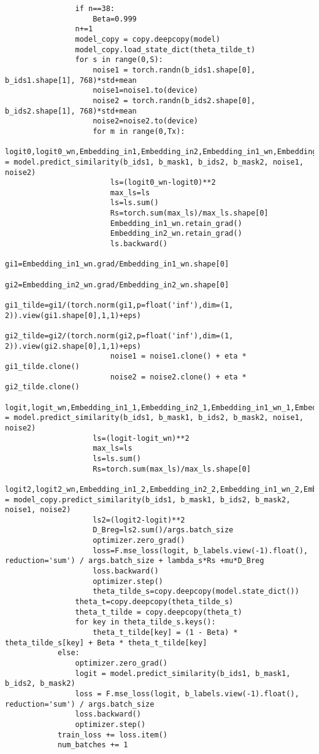 \begin{lstlisting}
                if n==38:
                    Beta=0.999
                n+=1
                model_copy = copy.deepcopy(model)
                model_copy.load_state_dict(theta_tilde_t)
                for s in range(0,S):
                    noise1 = torch.randn(b_ids1.shape[0], b_ids1.shape[1], 768)*std+mean
                    noise1=noise1.to(device)
                    noise2 = torch.randn(b_ids2.shape[0], b_ids2.shape[1], 768)*std+mean
                    noise2=noise2.to(device)
                    for m in range(0,Tx):
                        logit0,logit0_wn,Embedding_in1,Embedding_in2,Embedding_in1_wn,Embedding_in2_wn = model.predict_similarity(b_ids1, b_mask1, b_ids2, b_mask2, noise1, noise2)
                        ls=(logit0_wn-logit0)**2
                        max_ls=ls
                        ls=ls.sum()
                        Rs=torch.sum(max_ls)/max_ls.shape[0]
                        Embedding_in1_wn.retain_grad()
                        Embedding_in2_wn.retain_grad()
                        ls.backward()
                        gi1=Embedding_in1_wn.grad/Embedding_in1_wn.shape[0]
                        gi2=Embedding_in2_wn.grad/Embedding_in2_wn.shape[0]
                        gi1_tilde=gi1/(torch.norm(gi1,p=float('inf'),dim=(1, 2)).view(gi1.shape[0],1,1)+eps)
                        gi2_tilde=gi2/(torch.norm(gi2,p=float('inf'),dim=(1, 2)).view(gi2.shape[0],1,1)+eps)
                        noise1 = noise1.clone() + eta * gi1_tilde.clone()
                        noise2 = noise2.clone() + eta * gi2_tilde.clone()
                    logit,logit_wn,Embedding_in1_1,Embedding_in2_1,Embedding_in1_wn_1,Embedding_in2_wn_1 = model.predict_similarity(b_ids1, b_mask1, b_ids2, b_mask2, noise1, noise2) 
                    ls=(logit-logit_wn)**2
                    max_ls=ls
                    ls=ls.sum()
                    Rs=torch.sum(max_ls)/max_ls.shape[0]
                    logit2,logit2_wn,Embedding_in1_2,Embedding_in2_2,Embedding_in1_wn_2,Embedding_in2_wn_2 = model_copy.predict_similarity(b_ids1, b_mask1, b_ids2, b_mask2, noise1, noise2)
                    ls2=(logit2-logit)**2
                    D_Breg=ls2.sum()/args.batch_size
                    optimizer.zero_grad()
                    loss=F.mse_loss(logit, b_labels.view(-1).float(), reduction='sum') / args.batch_size + lambda_s*Rs +mu*D_Breg
                    loss.backward()
                    optimizer.step()
                    theta_tilde_s=copy.deepcopy(model.state_dict())
                theta_t=copy.deepcopy(theta_tilde_s)
                theta_t_tilde = copy.deepcopy(theta_t)
                for key in theta_tilde_s.keys():
                    theta_t_tilde[key] = (1 - Beta) * theta_tilde_s[key] + Beta * theta_t_tilde[key]
            else:
                optimizer.zero_grad()
                logit = model.predict_similarity(b_ids1, b_mask1, b_ids2, b_mask2)
                loss = F.mse_loss(logit, b_labels.view(-1).float(), reduction='sum') / args.batch_size
                loss.backward()
                optimizer.step()
            train_loss += loss.item()
            num_batches += 1


\end{lstlisting}
